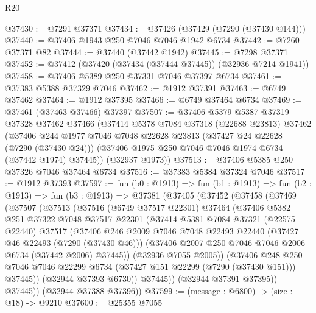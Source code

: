 \begin{lexlean}{R20}
\begin{coremodule}
{@37430 := @7291 @37371
@37434 := @37426 (@37429 (@7290 (@37430 @144)))
@37440 := @37406 @1943 @250 @7046 @7046 @1942 @6734
@37442 := @7260 @37371 @82
@37444 := @37440 (@37442 @1942)
@37445 := @7298 @37371
@37452 := @37412 (@37420 (@37434 (@37444 @37445)) (@32936 @7214 @1941))
@37458 := @37406 @5389 @250 @37331 @7046 @37397 @6734
@37461 := @37383 @5388 @37329 @7046
@37462 := @1912 @37391
@37463 := @6749 @37462
@37464 := @1912 @37395
@37466 := @6749 @37464 @6734
@37469 := @37461 (@37463 @37466) @37397
@37507 := @37406
    @5379
    @5387
    @37319
    @37328
    @37462
    @37466
    (@37414
      @5378
      @7084
      @37318
      (@22688 @23813)
      @37462
      (@37406
        @244
        @1977
        @7046
        @7048
        @22628
        @23813
        (@37427 @24 @22628 (@7290 (@37430 @24)))
        (@37406 @1975 @250 @7046 @7046 @1974 @6734 (@37442 @1974) @37445))
      (@32937 @1973))
@37513 := @37406 @5385 @250 @37326 @7046 @37464 @6734
@37516 := @37383 @5384 @37324 @7046
@37517 := @1912 @37393
@37597 := fun (b0 : @1913) =>
  fun (b1 : @1913) =>
  fun (b2 : @1913) =>
  fun (b3 : @1913) =>
  @37381
    (@37405
      (@37452
        (@37458
          (@37469
            (@37507
              (@37513
                (@37516
                  (@6749 @37517 @22301)
                  @37464
                  (@37406
                    @5382
                    @251
                    @37322
                    @7048
                    @37517
                    @22301
                    (@37414
                      @5381
                      @7084
                      @37321
                      (@22575 @22440)
                      @37517
                      (@37406
                        @246
                        @2009
                        @7046
                        @7048
                        @22493
                        @22440
                        (@37427 @46 @22493 (@7290 (@37430 @46)))
                        (@37406 @2007 @250 @7046 @7046 @2006 @6734 (@37442 @2006) @37445))
                      (@32936 @7055 @2005))
                    (@37406
                      @248
                      @250
                      @7046
                      @7046
                      @22299
                      @6734
                      (@37427 @151 @22299 (@7290 (@37430 @151)))
                      @37445))
                  (@32944 @37393 @6730))
                @37445))
            (@32944 @37391 @37395))
          @37445))
      (@32944 @37388 @37396))
@37599 := (message : @6800) -> (size : @18) -> @9210
@37600 := @25355 @7055
}
\end{coremodule}
\end{lexlean}
